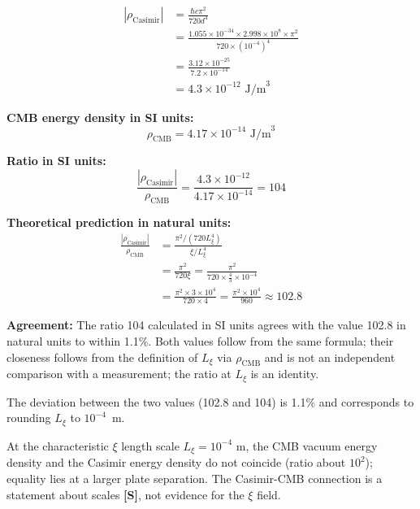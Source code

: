 	\begin{align}
		|\rho_{\text{Casimir}}| &= \frac{\hbar c \pi^2}{720 d^4} \\
		&= \frac{1.055 \times 10^{-34} \times 2.998 \times 10^8 \times \pi^2}{720 \times (10^{-4})^4} \\
		&= \frac{3.12 \times 10^{-25}}{7.2 \times 10^{-14}} \\
		&= 4.3 \times 10^{-12} \text{ J/m}^3
	\end{align}
	
	\textbf{CMB energy density in SI units:}
	\begin{equation}
		\rho_{\text{CMB}} = 4.17 \times 10^{-14} \text{ J/m}^3
	\end{equation}
	
	\textbf{Ratio in SI units:}
	\begin{equation}
		\frac{|\rho_{\text{Casimir}}|}{\rho_{\text{CMB}}} = \frac{4.3 \times 10^{-12}}{4.17 \times 10^{-14}} = 104
	\end{equation}
	
	\textbf{Theoretical prediction in natural units:}
	\begin{align}
		\frac{|\rho_{\text{Casimir}}|}{\rho_{\text{CMB}}} &= \frac{\pi^2 / (720 L_\xi^4)}{\xi / L_\xi^4} \\
		&= \frac{\pi^2}{720 \xi} = \frac{\pi^2}{720 \times \frac{4}{3} \times 10^{-4}} \\
		&= \frac{\pi^2 \times 3 \times 10^4}{720 \times 4} = \frac{\pi^2 \times 10^4}{960} \approx 102.8
	\end{align}
	
	\textbf{Agreement:} The ratio 104 calculated in SI units agrees with the value 102.8 in natural units to within 1.1\%. Both values follow from the same formula; their closeness follows from the definition of $L_\xi$ via $\rho_{\text{CMB}}$ and is not an independent comparison with a measurement; the ratio at $L_\xi$ is an identity.
	
	The deviation between the two values (102.8 and 104) is 1.1\% and corresponds to rounding $L_\xi$ to $10^{-4}$~m.
	
	\begin{important}
		At the characteristic $\xi$ length scale $L_\xi = 10^{-4}$ m, the CMB vacuum energy density and the Casimir energy density do not coincide (ratio about $10^2$); equality lies at a larger plate separation. The Casimir-CMB connection is a statement about scales \textbf{[S]}, not evidence for the $\xi$ field.
	\end{important}
	
